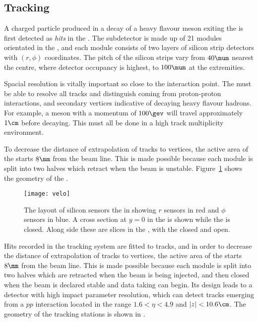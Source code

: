 \subsection{Tracking}

A charged particle produced in a decay of a heavy flavour meson exiting the \pv is first detected
as \emph{hits} in the \velo.
The \velo subdetector is made up of 21 modules orientated in the , and
each module consists of two layers of silicon strip detectors with $(r,\phi)$ coordinates.
The pitch of the silicon strips vary from \approx$40\mum$ nearest the centre, where detector occupancy
is highest, to \approx$100\mum$ at the extremities.

Spacial resolution is vitally important so close to the interaction point.
The \velo must be able to resolve all tracks and distinguish  coming from
proton-proton interactions, and secondary vertices indicative of decaying heavy flavour hadrons.
For example, a \Bp meson with a momentum of $100\gev$ will travel approximately $1\cm$ before decaying.
This must all be done in a high track multiplicity environment.


To decrease the distance of extrapolation of tracks to vertices,
the active area of the \velo starts $8\mm$ from the beam line.
This is made possible because each module is split into two halves which retract when the \lhc beam
is unstable.
Figure~\ref{fig:lhcb:velo} shows the geometry of the \velo.

\begin{figure}
  \begin{center}
    \texttt{[image: velo]}
  \end{center}
  \caption[Diagram of the LHCb Vertex Locator]
  {
    The layout of silicon sensors the \velo in showing $r$ sensors in red and $\phi$ sensors in
    blue.
    A cross section at $y=0$ in the  is shown while the \velo is closed.
    Along side these are slices in the , with the \velo closed and open.
  }
  \label{fig:lhcb:velo}
\end{figure}

Hits recorded in the tracking system are fitted to tracks, and in order to decrease the
distance of extrapolation of tracks to vertices,
the active area of the \velo starts $8\mm$ from the beam line.
This is made possible because each module is split into two halves which are retracted when the
\lhc beam is being injected, and then closed when the beam is declared stable and data taking can
begin.
Its design leads to a detector with high impact parameter resolution, which can detect tracks
emerging from a $pp$ interaction located in the range $1.6<\eta<4.9$ and $|z|<10.6\cm$.
The geometry of the tracking stations is shown in .

